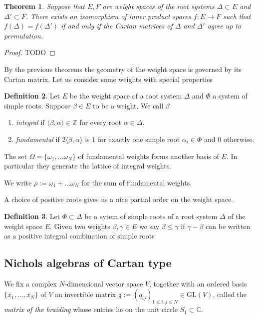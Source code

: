\documentclass{amsart}
\newtheorem{theorem}{Theorem}[section]
\theoremstyle{definition}
\newtheorem{definition}[theorem]{Definition}
\begin{document}
\begin{theorem}
	Suppose that $E, F$ are weight spaces of the root systems $\Delta \subset E$ and $\Delta' \subset F$.
	There exists an isomorphism of inner product spaces $f:E \rightarrow F$ such that $f(\Delta) = f(\Delta')$ if and only if 
	the Cartan matrices of $\Delta$ and $\Delta'$ agree up to permutation.
\end{theorem}
\begin{proof}
	TODO
\end{proof}

By the previous theorems the geometry of the weight space is governed by its Cartan matrix.
Let us consider some weights with special properties

\begin{definition}
	Let $E$ be the weight space of a root system $\Delta$ and $\Phi$ a system of simple roots.
	Suppose $\beta \in E$ to be a weight. 
	We call $\beta$
	\begin{enumerate}
		\item \emph{integral} if $\langle \beta,\alpha \rangle  \in \mathbb Z$ for every root $\alpha \in \Delta$.
		\item \emph{fundamental} if $2\langle \beta, \alpha \rangle$ is $1$ for exactly one simple root $\alpha_i \in \Phi$ and $0$ otherwise. 
	\end{enumerate}
	The set $\Omega = \{ \omega_1, \dotsc \omega_N\}$ of fundamental weights forms another basis of $E$. In particular they generate the lattice of integral weights.
	
	We write  $\rho := \omega_1+ \dotsc \omega_N$ for the sum of fundamental weights.
\end{definition} 

A choice of positive roots gives us a nice partial order on the weight space.

\begin{definition}
	Let $\Phi\subset  \Delta$ be a sytem of simple roots of a  root system $\Delta$ of the weight space $E$.
	Given two weights $\beta, \gamma \in E$ we say
	$\beta \leq \gamma$ if $\gamma-\beta$ can be written as a positive integral combination of simple roots
\end{definition}


\subsection{Nichols algebras of Cartan type}

We fix a complex $N$-dimensional vector space $V$, together with an ordered basis $\{x_1, \dotsc, x_N\}$  of $V$ an invertible matrix $\mathfrak q := (q_{ij})_{1 \leq i,j \leq N} \in \text{GL}(V)$, called the \emph{matrix of the braiding} whose entries lie on the unit circle $S_1 \subset \mathbb C$.
\end{document}
